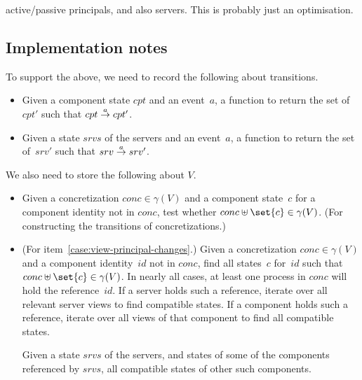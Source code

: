active/passive principals, and also servers.  This is probably just an
optimisation. 






\subsection{Implementation notes}

To support the above, we need to record the following about transitions.
%
\begin{itemize}
\item
Given a component state $cpt$ and an event~$a$, a function to return the set
of $cpt'$ such that $cpt \stackrel{a}\rightarrow cpt'$.

\item
Given a state $srvs$ of the servers and an event~$a$, a function to return the
set of~$srv'$ such that $srv \stackrel{a}\rightarrow srv'$.
\end{itemize}

We also need to store the following about $V$.
\begin{itemize}
\item
Given a concretization $conc \in \gamma(V)$ and a component state~$c$ for a
component identity not in $conc$, test whether $conc \uplus \set{c} \in
\gamma(V)$.  (For constructing the transitions of concretizations.)

\item (For item~\ref{case:view-principal-changes}.) Given a concretization
  $conc \in \gamma(V)$ and a component identity~$id$ not in $conc$, find all
  states~$c$ for~$id$ such that $conc \uplus \set{c} \in \gamma(V)$.  In
  nearly all cases, at least one process in $conc$ will hold the
  reference~$id$.  If a server holds such a reference, iterate over all
  relevant server views to find compatible states.  If a component holds such
  a reference, iterate over all views of that component to find all compatible
  states. 



Given a state $srvs$ of the servers, and states of some of the components
referenced by $srvs$, all compatible states of other such components.

\end{itemize}
